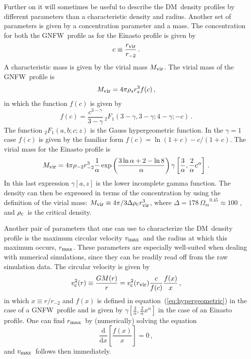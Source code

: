 \documentclass[aps,prd,twocolumn,amsmath,amssymb,floatfix,nofootinbib,10pt]{revtex4}
\newcommand{\NFW}{NFW}
\newcommand{\GNFW}{G\NFW}
\newcommand{\DM}{DM}
\newcommand{\dd}{\mathrm{d}}
\newcommand{\eqnname}{equation}
\newcommand{\rhos}{\ensuremath{\rho_s}}
\newcommand{\rs}{\ensuremath{r_s}}
\newcommand{\rhominustwo}{\ensuremath{\rho_{-2}}}
\newcommand{\rminustwo}{\ensuremath{r_{-2}}}
\newcommand{\alphaEinasto}{\ensuremath{\alpha}}
\newcommand{\Mvir}{\ensuremath{M_{\mbox{{\footnotesize vir}}}}}
\newcommand{\Rvir}{\ensuremath{r_{\mbox{{\footnotesize vir}}}}}
\newcommand{\conc}{\ensuremath{c}}
\newcommand{\rhoc}{\ensuremath{\rho_{\mbox{{\footnotesize c}}}}}
\newcommand{\omegam}{\ensuremath{\Omega_{m}}}
\newcommand{\vcirc}{\ensuremath{v_{\mbox{{\footnotesize c}}}}}
\newcommand{\vmax}{\ensuremath{v_{\mbox{{\footnotesize max}}}}}
\newcommand{\rmax}{\ensuremath{r_{\mbox{{\footnotesize max}}}}}
\begin{document}
Further on it will sometimes be useful to describe the \DM\ density
profiles by different parameters than a characteristic density and
radius. Another set of parameters is given by a concentration
parameter and a mass. The concentration for both the \GNFW\ profile as
for the Einasto profile is given by
\begin{equation}\label{eq:concdef}
\conc \equiv \frac{\Rvir}{\rminustwo}\, .
\end{equation}
A characteristic mass is given by the virial mass \Mvir. The virial
mass of the \GNFW\ profile is
\begin{equation}\label{eq:Mvirdef}
\Mvir = 4\pi\rhos\rs^3 f(c)\, ,
\end{equation}
in which the function $f(c)$ is given by
\begin{equation}\label{eq:hypergeometric}
f(c) = \frac{c^{3-\gamma}}{3-\gamma} \, {_2F_1}\left(3-\gamma,3-\gamma;4-\gamma;-c\right)\, .
\end{equation}
The function $_2 F_1\left(a,b;c;z\right)$ is the Gauss hypergeometric
function. In the $\gamma = 1$ case $f(c)$ is given by the familiar
form $f(c) = \ln(1+c)-c/(1+c)$. The virial mass for the Einasto
profile is
\begin{equation}
\Mvir = 4\pi\rhominustwo\rminustwo^3 \frac{1}{\alphaEinasto} \exp\left(\frac{3\ln \alphaEinasto + 2 - \ln 8}{\alphaEinasto}\right) \gamma\left[\frac{3}{\alphaEinasto},\frac{2}{\alphaEinasto}\conc^\alphaEinasto\right]\, .
\end{equation}
In this last expression $\gamma\left[a,z\right]$ is the lower
incomplete gamma function. The density can then be expressed in terms
of the concentration by using the definition of the virial mass:
$\Mvir \equiv 4\pi/3 \Delta \rhoc \Rvir^3$, where $\Delta = 178\,
\omegam^{0.45} \approx 100$
\cite{1996MNRAS.282..263E,1998ApJ...495...80B}, and \rhoc\ is the
critical density.

Another pair of parameters that one can use to characterize the \DM\
density profile is the maximum circular velocity \vmax\ and the radius
at which this maximum occurs, \rmax. These parameters are especially
well-suited when dealing with numerical simulations, since they can be
readily read off from the raw simulation data. The circular velocity
is given by
\begin{equation}
\vcirc^2(r) \equiv \frac{G M(r)}{r} = \vcirc^2(\Rvir)\frac{c}{f(c)}\frac{f(x)}{x}\, ,
\end{equation}
in which $x \equiv r/\rminustwo$ and $f(x)$ is defined in \eqnname\
(\ref{eq:hypergeometric}) in the case of a \GNFW\ profile and is given
by
$\gamma\left[\frac{3}{\alphaEinasto},\frac{2}{\alphaEinasto}x^\alphaEinasto\right]$
in the case of an Einasto profile. One can find \rmax\ by
(numerically) solving the equation
\begin{equation}
\frac{\dd}{\dd x}\left[ \frac{f(x)}{x}\right] = 0\, ,
\end{equation}
and \vmax\ follows then immediately.
\end{document}
